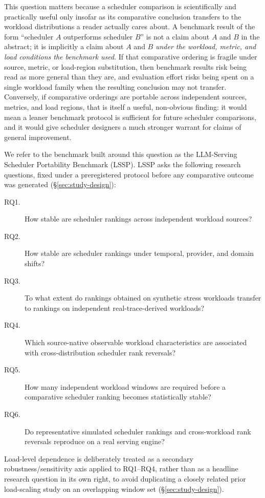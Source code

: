 This question matters because a scheduler comparison is scientifically and
practically useful only insofar as its comparative conclusion transfers to
the workload distributions a reader actually cares about. A benchmark result
of the form ``scheduler $A$ outperforms scheduler $B$'' is not a claim about
$A$ and $B$ in the abstract; it is implicitly a claim about $A$ and $B$
\emph{under the workload, metric, and load conditions the benchmark used}.
If that comparative ordering is fragile under source, metric, or
load-region substitution, then benchmark results risk being read as more
general than they are, and evaluation effort risks being spent on a single
workload family when the resulting conclusion may not transfer. Conversely,
if comparative orderings are portable across independent sources, metrics,
and load regions, that is itself a useful, non-obvious finding: it would
mean a leaner benchmark protocol is sufficient for future scheduler
comparisons, and it would give scheduler designers a much stronger warrant
for claims of general improvement.

We refer to the benchmark built around this question as the LLM-Serving
Scheduler Portability Benchmark (LSSP). LSSP asks the following research
questions, fixed under a preregistered protocol before any comparative
outcome was generated (\S\ref{sec:study-design}):

\begin{description}
  \item[RQ1.] How stable are scheduler rankings across independent
    workload sources?
  \item[RQ2.] How stable are scheduler rankings under temporal, provider,
    and domain shifts?
  \item[RQ3.] To what extent do rankings obtained on synthetic stress
    workloads transfer to rankings on independent real-trace-derived
    workloads?
  \item[RQ4.] Which source-native observable workload characteristics are
    associated with cross-distribution scheduler rank reversals?
  \item[RQ5.] How many independent workload windows are required before a
    comparative scheduler ranking becomes statistically stable?
  \item[RQ6.] Do representative simulated scheduler rankings and
    cross-workload rank reversals reproduce on a real serving engine?
\end{description}

Load-level dependence is deliberately treated as a secondary
robustness/sensitivity axis applied to RQ1--RQ4, rather than as a headline
research question in its own right, to avoid duplicating a closely related
prior load-scaling study on an overlapping window set
(\S\ref{sec:study-design}).

